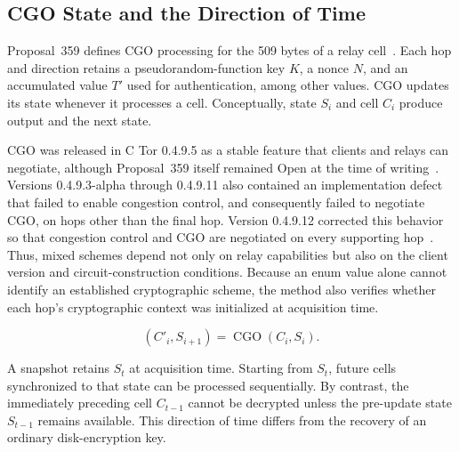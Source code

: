 \documentclass[10pt,a4paper]{article}
\begin{document}
\subsection{CGO State and the Direction of Time}

Proposal~359 defines CGO processing for the 509 bytes of a relay cell~\cite{torproposal359}.
Each hop and direction retains a pseudorandom-function key $K$, a nonce $N$, and an accumulated value $T'$ used for authentication, among other values.
CGO updates its state whenever it processes a cell. Conceptually, state $S_i$ and cell $C_i$ produce output and the next state.

CGO was released in C Tor 0.4.9.5 as a stable feature that clients and relays can negotiate, although Proposal~359 itself remained Open at the time of writing~\cite{torstable0495,torproposal359}. Versions 0.4.9.3-alpha through 0.4.9.11 also contained an implementation defect that failed to enable congestion control, and consequently failed to negotiate CGO, on hops other than the final hop. Version 0.4.9.12 corrected this behavior so that congestion control and CGO are negotiated on every supporting hop~\cite{torrelease04912}. Thus, mixed schemes depend not only on relay capabilities but also on the client version and circuit-construction conditions. Because an enum value alone cannot identify an established cryptographic scheme, the method also verifies whether each hop's cryptographic context was initialized at acquisition time.

\begin{equation}
  (C'_i, S_{i+1}) = \operatorname{CGO}(C_i,S_i).
\end{equation}

A snapshot retains $S_t$ at acquisition time. Starting from $S_t$, future cells synchronized to that state can be processed sequentially. By contrast, the immediately preceding cell $C_{t-1}$ cannot be decrypted unless the pre-update state $S_{t-1}$ remains available. This direction of time differs from the recovery of an ordinary disk-encryption key.
\end{document}
